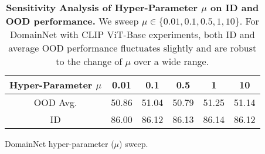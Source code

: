 \begin{table}[!h]

\begin{subtable}[t]{1\textwidth}
\centering
\begin{tabular}[h]{c|ccccc}
\toprule
Hyper-Parameter $\mu$ & 0.01 & 0.1 & 0.5 & 1 & 10\\
\midrule
OOD Avg. & 50.86 & 51.04 & 50.79 & 51.25 & 51.14\\
\midrule
ID & 86.00 & 86.12 & 86.13 & 86.14 & 86.12\\
\bottomrule
\end{tabular}
\caption{DomainNet hyper-parameter ($\mu$) sweep.}
\label{tab:dom_hyper}
\end{subtable}

\caption{\textbf{Sensitivity Analysis of Hyper-Parameter $\mu$ on ID and OOD performance.} We sweep $\mu \in \{0.01, 0.1, 0.5, 1, 10\}$. For DomainNet with CLIP ViT-Base experiments, both ID and average OOD performance fluctuates slightly and are robust to the change of $\mu$ over a wide range.}
\label{tab:hyper_img}
\end{table}

